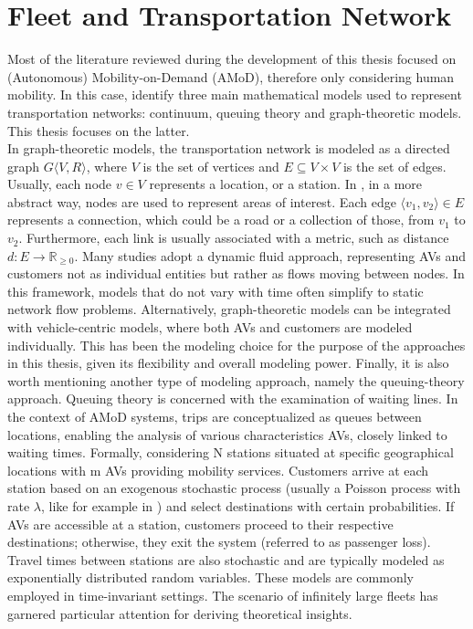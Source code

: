 \section{Fleet and Transportation Network}\label{sec:model_systems}
Most of the literature reviewed during the development of this thesis focused on (Autonomous) Mobility-on-Demand (AMoD), therefore only considering human mobility.%
 In this case,  identify three main mathematical models used to represent transportation networks: continuum, queuing theory and graph-theoretic models. This thesis focuses on the latter. \\
In graph-theoretic models, the transportation network is modeled as a directed graph $G \langle V, R\rangle$, where $V$ is the set of vertices and $E\subseteq V \times V$ is the set of edges. Usually, each node $v \in V$ represents a location, or a station. In \cite{project_thesis}, in a more abstract way, nodes are used to represent areas of interest. Each edge $\langle v_1, v_2\rangle \in E$ represents a connection, which could be a road or a collection of those, from $v_1$ to $v_2$. Furthermore, each link is usually associated with a metric, such as distance $d : E \rightarrow \mathbb{R}_{\ge0}$. Many studies adopt a dynamic fluid approach, representing AVs and customers not as individual entities but rather as flows moving between nodes. In this framework, models that do not vary with time often simplify to static network flow problems. Alternatively, graph-theoretic models can be integrated with vehicle-centric models, where both AVs and customers are modeled individually. This has been the modeling choice for the purpose of the approaches in this thesis, given its flexibility and overall modeling power. Finally, it is also worth mentioning another type of modeling approach, namely the queuing-theory approach. Queuing theory is concerned with the examination of waiting lines. In the context of AMoD systems, trips are conceptualized as queues between locations, enabling the analysis of various characteristics AVs, closely linked to waiting times. Formally, considering N stations situated at specific geographical locations with m AVs providing mobility services. Customers arrive at each station based on an exogenous stochastic process (usually a Poisson process with rate $\lambda$, like for example in \cite{queue_theory}) and select destinations with certain probabilities. If AVs are accessible at a station, customers proceed to their respective destinations; otherwise, they exit the system (referred to as passenger loss). Travel times between stations are also stochastic and are typically modeled as exponentially distributed random variables. These models are commonly employed in time-invariant settings. The scenario of infinitely large fleets has garnered particular attention for deriving theoretical insights.
